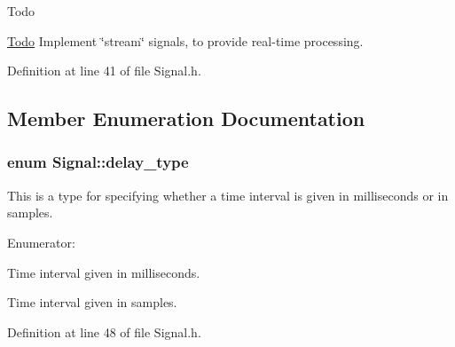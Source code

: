 \begin{DoxyRefDesc}{\-Todo}
\item[\hyperlink{todo__todo000005}{\-Todo}]\-Implement \char`\"{}stream\char`\"{} signals, to provide real-\/time processing. \end{DoxyRefDesc}


\-Definition at line 41 of file \-Signal.\-h.



\subsection{\-Member \-Enumeration \-Documentation}
\hypertarget{classSignal_a45a2f1394f9d0be6fbaaf5160fa4817c}{
\subsubsection[{delay\-\_\-type}]{\setlength{\rightskip}{0pt plus 5cm}enum {\bf \-Signal\-::delay\-\_\-type}}}\label{classSignal_a45a2f1394f9d0be6fbaaf5160fa4817c}
\-This is a type for specifying whether a time interval is given in milliseconds or in samples. \begin{Desc}
\item[\-Enumerator\-: ]\par
\begin{description}
\item[{\em 
\hypertarget{classSignal_a45a2f1394f9d0be6fbaaf5160fa4817caef04e6566ce27c94225e907c909af620}{\-M\-S}\label{classSignal_a45a2f1394f9d0be6fbaaf5160fa4817caef04e6566ce27c94225e907c909af620}
}]\-Time interval given in milliseconds. \item[{\em 
\hypertarget{classSignal_a45a2f1394f9d0be6fbaaf5160fa4817ca29508a29e1f1dfb176239b6eb843c53d}{\-S\-A\-M\-P\-L\-E}\label{classSignal_a45a2f1394f9d0be6fbaaf5160fa4817ca29508a29e1f1dfb176239b6eb843c53d}
}]\-Time interval given in samples. \end{description}
\end{Desc}



\-Definition at line 48 of file \-Signal.\-h.



